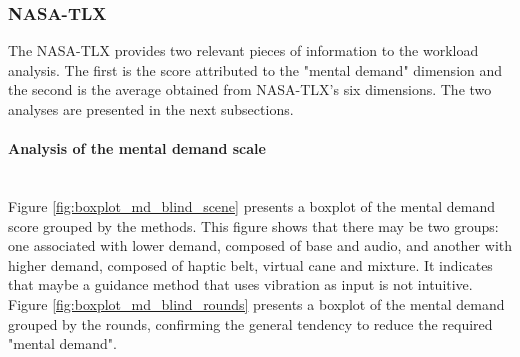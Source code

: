 \subsubsection{NASA-TLX}
\label{subsubsec:results_nasa_tlx_1}

The NASA-TLX provides two relevant pieces of information to the workload analysis. The first is the score attributed to the "mental demand" dimension and the second is the average obtained from NASA-TLX's six dimensions. The two analyses are presented in the next subsections.

\paragraph*{Analysis of the mental demand scale}\mbox{}\\

%

Figure \ref{fig:boxplot_md_blind_scene}  presents a boxplot of the mental demand score grouped by the methods. This figure shows that there may be two groups: one associated with lower demand, composed of base and audio, and another with higher demand, composed of haptic belt, virtual cane and mixture. It indicates that maybe a guidance method that uses vibration as input is not intuitive. Figure \ref{fig:boxplot_md_blind_rounds} presents a boxplot of the mental demand grouped by the rounds, confirming the general tendency to reduce the required "mental demand". 

